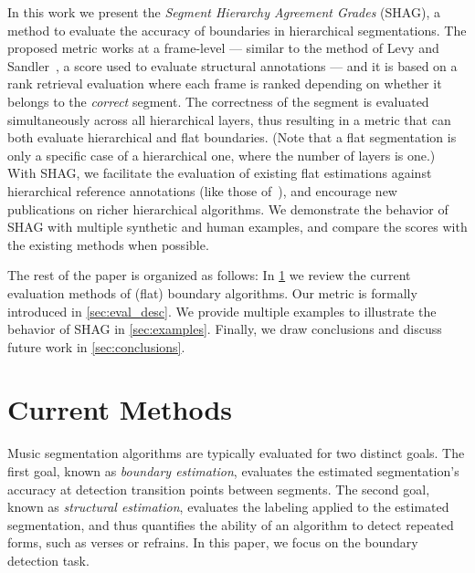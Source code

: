 \documentclass{article}
\begin{document}

In this work we present the \emph{Segment Hierarchy Agreement Grades} (SHAG), a method to evaluate the accuracy of boundaries in hierarchical segmentations.
The proposed metric works at a frame-level --- similar to the method of Levy and Sandler~\cite{Levy2008}, a score used to evaluate structural annotations --- and it is based on a rank retrieval evaluation where each frame is ranked depending on whether it belongs to the \emph{correct} segment.
The correctness of the segment is evaluated simultaneously across all hierarchical layers, thus resulting in a metric that can both evaluate hierarchical and flat boundaries. (Note
that a flat segmentation is only a specific case of a hierarchical one, where the number of layers is one.)
With SHAG, we facilitate the evaluation of existing flat estimations against hierarchical reference annotations (like those of~\cite{Smith2011}), and encourage new publications on richer hierarchical algorithms.
We demonstrate the behavior of SHAG with multiple synthetic and human examples, and compare the scores with the existing methods when possible.


The rest of the paper is organized as follows: In \cref{sec:curr_meth} we review the current evaluation methods of (flat) boundary algorithms. 
Our metric is formally introduced in \cref{sec:eval_desc}. 
We provide multiple examples to illustrate the behavior of SHAG in \cref{sec:examples}.
Finally, we draw conclusions and discuss future work in \cref{sec:conclusions}.

\section{Current Methods}\label{sec:curr_meth}

Music segmentation algorithms are typically evaluated for two distinct goals.  
The first goal, known as \emph{boundary estimation}, evaluates the estimated segmentation's accuracy at detection transition points between segments.
The second goal, known as \emph{structural estimation}, evaluates the labeling applied to the estimated segmentation, and thus quantifies the ability of an algorithm to detect repeated
forms, such as verses or refrains.  In this paper, we focus on the boundary detection task.
\end{document}
